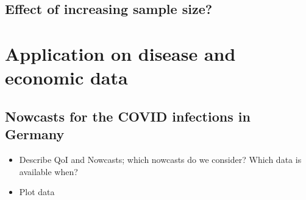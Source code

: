 \documentclass[oneside]{article}
\theoremstyle{plain}%
\theoremstyle{definition}
\newcommand{\ydiff}{D y}
\newcommand{\xdiff}{Dx}
\newcommand{\SBer}{\text{SBer}}
\begin{document}






\subsection{Effect of increasing sample size?}

\section{Application on disease and economic data}

\subsection{Nowcasts for the COVID infections in Germany}

\begin{itemize}
  \item Describe QoI and Nowcasts; which nowcasts do we consider? Which data is available when?
  \item Plot data
\end{itemize}
\end{document}
